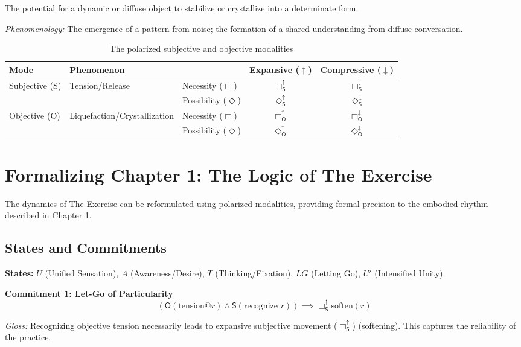 \documentclass[12pt]{book}
\newcommand{\SBoxUp}{\Box_{\mathsf{S}}^{\uparrow}}
\newcommand{\SBoxDown}{\Box_{\mathsf{S}}^{\downarrow}}
\newcommand{\SDiaUp}{\Diamond_{\mathsf{S}}^{\uparrow}}
\newcommand{\SDiaDown}{\Diamond_{\mathsf{S}}^{\downarrow}}
\newcommand{\OBoxUp}{\Box_{\mathsf{O}}^{\uparrow}}
\newcommand{\OBoxDown}{\Box_{\mathsf{O}}^{\downarrow}}
\newcommand{\ODiaUp}{\Diamond_{\mathsf{O}}^{\uparrow}}
\newcommand{\ODiaDown}{\Diamond_{\mathsf{O}}^{\downarrow}}
\begin{document}
The potential for a dynamic or diffuse object to stabilize or crystallize into a determinate form.

\textit{Phenomenology:} The emergence of a pattern from noise; the formation of a shared understanding from diffuse conversation.

\begin{table}[H]
 \centering
 \begin{tabular}{lllcc}
\toprule
Mode & Phenomenon & & Expansive ($\uparrow$) & Compressive ($\downarrow$) \\
\midrule
\multirow{2}{*}{Subjective (S)} & \multirow{2}{*}{Tension/Release} & Necessity ($\Box$) & $\SBoxUp$ & $\SBoxDown$ \\
& & Possibility ($\Diamond$) & $\SDiaUp$ & $\SDiaDown$ \\
\midrule
\multirow{2}{*}{Objective (O)} & \multirow{2}{*}{Liquefaction/Crystallization} & Necessity ($\Box$) & $\OBoxUp$ & $\OBoxDown$ \\
& & Possibility ($\Diamond$) & $\ODiaUp$ & $\ODiaDown$ \\
\bottomrule
\end{tabular}
\caption{The polarized subjective and objective modalities}
\label{tab:polarized_modalities}
\end{table}

\section{Formalizing Chapter 1: The Logic of The Exercise}

The dynamics of The Exercise can be reformulated using polarized modalities, providing formal precision to the embodied rhythm described in Chapter 1.

\subsection{States and Commitments}

\textbf{States:} $U$ (Unified Sensation), $A$ (Awareness/Desire), $T$ (Thinking/Fixation), $LG$ (Letting Go), $U'$ (Intensified Unity).

\bigskip

\noindent\textbf{Commitment 1: Let-Go of Particularity}
$$ (\mathsf{O}(\text{tension@}r) \wedge \mathsf{S}(\text{recognize }r)) \implies \SBoxUp\text{soften}(r) $$

\textit{Gloss:} Recognizing objective tension necessarily leads to expansive subjective movement ($\SBoxUp$) (softening). This captures the reliability of the practice.
\end{document}

